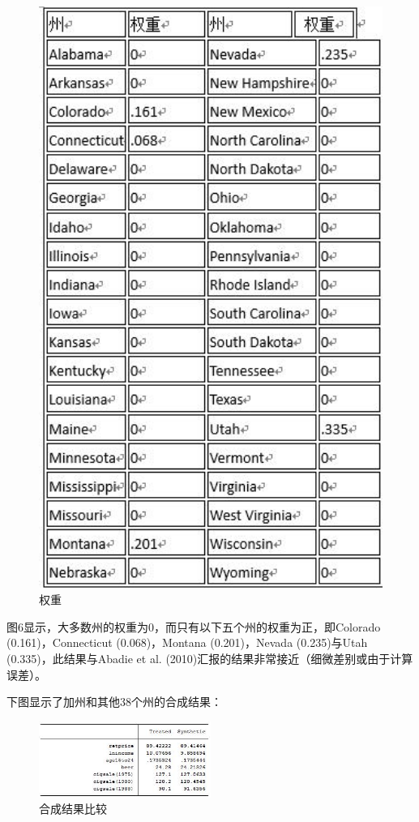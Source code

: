 \documentclass[cn,12pt,math=newtx,citestyle=gb7714-2015,bibstyle=gb7714-2015]{elegantbook}
\begin{document}
	\begin{figure}[htbp]
		\centering
		\includegraphics[width=1\textwidth]{weight.jpg}
		\caption{权重}\label{fig:digit}
	\end{figure}
	
	图6显示，大多数州的权重为0，而只有以下五个州的权重为正，即Colorado (0.161)，Connecticut (0.068)，Montana (0.201)，Nevada (0.235)与Utah (0.335)，此结果与Abadie et al. (2010)汇报的结果非常接近（细微差别或由于计算误差）。
	
	下图显示了加州和其他38个州的合成结果：
	
	\begin{figure}[htbp]
		\centering
		\includegraphics[width=0.5\textwidth]{sys.jpg}
		\caption{合成结果比较}\label{fig:digit}
	\end{figure}
	
\end{document}
